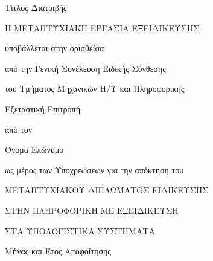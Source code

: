 \thispagestyle{empty}
\begin{center}
	{\LARGE Τίτλος Διατριβής}
	\par
	\vspace{2.5cm} {\Large Η ΜΕΤΑΠΤΥΧΙΑΚΗ ΕΡΓΑΣΙΑ ΕΞΕΙΔΙΚΕΥΣΗΣ}
	
	\vspace{1.25cm} {\Large υποβάλλεται στην ορισθείσα}
	
	\vspace{0.75cm} {\Large από την Γενική Συνέλευση Ειδικής Σύνθεσης}
	
	\vspace{0.25cm} {\Large του Τμήματος Μηχανικών Η/Υ και Πληροφορικής}
	
	\vspace{0.25cm} {\Large Εξεταστική Επιτροπή}
	
	\vspace{1.25cm} {\Large από τον}
	
	\vspace{1.75cm} {\LARGE Όνομα Επώνυμο}
	
	\vspace{1.25cm} {\Large ως μέρος των Υποχρεώσεων για την απόκτηση του}
	
	\vspace{1.75cm} {\Large ΜΕΤΑΠΤΥΧΙΑΚΟΥ ΔΙΠΛΩΜΑΤΟΣ ΕΙΔΙΚΕΥΣΗΣ}
	
	\vspace{0.5cm} {\Large ΣΤΗΝ ΠΛΗΡΟΦΟΡΙΚΗ ΜΕ ΕΞΕΙΔΙΚΕΥΣΗ}
	
	\vspace{0.5cm} {\Large ΣΤΑ ΥΠΟΛΟΓΙΣΤΙΚΑ ΣΥΣΤΗΜΑΤΑ}
	\par
	\vfill {\Large Μήνας και Έτος Αποφοίτησης}
\end{center}